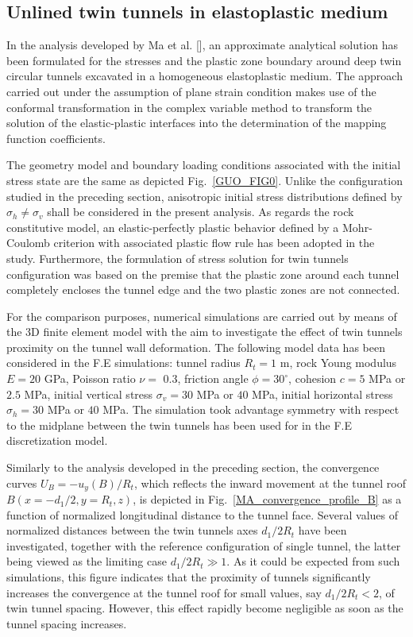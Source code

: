 \documentclass[a4paper,fleqn]{cas-sc}
\begin{document}
\subsection{Unlined twin tunnels in elastoplastic medium}\label{}


In the analysis developed by Ma et al. [], an approximate analytical solution has been formulated for the stresses and the plastic zone boundary around deep twin circular tunnels excavated in a homogeneous elastoplastic medium. The approach carried out under the assumption of plane strain condition makes use of the conformal transformation in the complex variable method to transform the solution of the elastic-plastic interfaces into the determination of the mapping function coefficients.

The geometry model and boundary loading conditions associated with the initial stress state are the same as depicted Fig.~\ref{GUO_FIG0}. Unlike the configuration studied in the preceding section, anisotropic initial stress distributions defined by $\sigma_h \neq \sigma_v$ shall be considered in the present analysis. As regards the rock constitutive model, an elastic-perfectly plastic behavior defined by a Mohr-Coulomb criterion with associated plastic flow rule has been adopted in the study.  Furthermore, the formulation of stress solution for twin tunnels configuration was based on the premise that the plastic zone around each tunnel completely encloses the tunnel edge and the two plastic zones are not connected.

For the comparison purposes, numerical simulations are carried out by means of the 3D finite element model with the aim to investigate the effect of twin tunnels proximity on the tunnel wall deformation. The following model data has been considered in the F.E simulations: tunnel radius $R_t = 1$ m, rock Young modulus $E = 20$ GPa, Poisson ratio $\nu =$ 0.3, friction angle $\phi = 30^\circ$, cohesion $c = 5$ MPa or $2.5$ MPa, initial vertical stress $\sigma_v =30$ MPa or $40$ MPa, initial horizontal stress $\sigma_h = 30$ MPa or $40$ MPa. The simulation took advantage symmetry with respect to the midplane between the twin tunnels has been used for in the F.E discretization model.

Similarly to the analysis developed in the preceding section, the convergence curves $U_B=-u_y(B)/R_t$, which reflects the inward movement at the tunnel roof $B(x=-d_1/2, y=R_t, z)$, is depicted in Fig.~\ref{MA_convergence_profile_B} as a function of normalized longitudinal distance to the tunnel face. Several values of normalized distances between the twin tunnels axes $d_1/2R_t$ have been investigated, together with the reference configuration of single tunnel, the latter being viewed as the limiting case $d_1/2R_t \gg 1$. As it could be expected from such simulations, this figure indicates that the proximity of tunnels significantly increases the convergence at the tunnel roof for small values, say $d_1/2R_t < 2$, of twin tunnel spacing. However, this effect rapidly become negligible as soon as the tunnel spacing increases.
\end{document}
